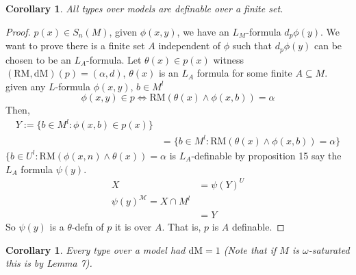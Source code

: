 \documentclass[letterpaper, 12pt]{article}
\newcommand{\cM}{\mathcal{M}}
\newcommand{\RM}{\mbox{RM}}
\newcommand{\dM}{\mbox{dM}}
\theoremstyle{stdthm}
\newtheorem{cor}[thm]{Corollary}
\theoremstyle{stddef}
\theoremstyle{stdnonum}
\theoremstyle{stdqands}
\theoremstyle{stdbold}
\begin{document}
\begin{cor}
All types over models are definable over a finite set. 
\end{cor}

\begin{proof}
$p(x) \in S_n(M)$, given $\phi(x,y)$, we have an $L_M$-formula $d_p\phi(y)$. We want to prove there is a finite set $A$ independent of $\phi$ such that $d_p \phi(y)$ can be chosen to be an $L_A$-formula. Let $\theta(x) \in p(x)$ witness $(\RM,\dM)(p) = (\alpha,d)$, $\theta(x)$ is an $L_A$ formula for some finite $A \subseteq M$. \\

given any $L$-formula $\phi(x,y)$, $b \in M^l$ 
\[ \phi(x,y) \in p \iff \RM(\theta(x) \wedge \phi(x,b)) = \alpha \]
Then,
\begin{align*}
Y:= \{b \in M^l : \phi(x,b) \in p(x) \}\\
&= \{b \in M^l: \RM(\theta(x) \wedge \phi(x,b)) = \alpha \}
\end{align*}
$\{b \in U^l: \RM(\phi(x,n) \wedge \theta(x))=\alpha$ is $L_A$-definable by proposition 15 say the $L_A$ formula $\psi(y)$. 
\begin{align*}
X &= \psi(Y)^U \\
\psi(y)^\cM = X \cap M^l \\
&= Y
\end{align*}
So $\psi(y)$ is a $\theta$-defn of $p$ it is over $A$. That is, $p$ is $A$ definable. 

\end{proof}

\begin{cor}
Every type over a model had $\dM = 1$ (Note that if $M$ is $\omega$-saturated this is by Lemma 7). 
\end{cor}
\end{document}
